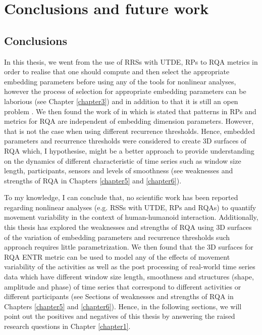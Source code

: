 \chapter{Conclusions and future work}

\section{Conclusions}
In this thesis, we went from the use of RRSs with UTDE, RPs to 
RQA metrics in order to realise
that one should compute and then select the appropriate embedding parameters 
before using any of the tools for nonlinear analyses, however the process of 
selection for appropriate embedding parameters can be laborious 
(see Chapter \ref{chapter3}) and in addition to that it is still an 
open problem \citep{gomezgarcia2014}.
We then found the work of \citep{iwanski1998} in which is stated that 
patterns in RPs and metrics for RQA are independent of embedding 
dimension parameters. However, that is not the case when using different 
recurrence thresholds. 
Hence, embedded parameters and recurrence thresholds were considered 
to create 3D surfaces of RQA which, I hypothesise, might be a better approach
to provide understanding on the dynamics of different characteristic of 
time series 
such as window size length, participants, sensors and levels of smoothness
(see weaknesses and strengths of RQA in Chapters \ref{chapter5} and 
\ref{chapter6}).

To my knowledge, I can conclude that, no scientific work has been reported 
regarding nonlinear analyses (e.g. RSSs with UTDE, RPs and RQAs) to 
quantify movement variability in the context of human-humanoid interaction.
Additionally, this thesis has explored the weaknesses and strengths of RQA
using 3D surfaces of the variation of embedding parameters and recurrence
thresholds such approach requires little parametrization.
We then found that the 3D surfaces for RQA ENTR metric can be used 
to model any of the effects of movement variability of the activities 
as well as the post processing of real-world time series data 
which have different window size length,
smoothness and structures (shape, amplitude and phase) of time series
that correspond to different activities or different participants
(see Sections of weaknesses and strengths of RQA in Chapters 
\ref{chapter5} and \ref{chapter6}).
Hence, in the following sections, we will point out the positives
and negatives of this thesis by answering the raised research questions 
in Chapter \ref{chapter1}.





